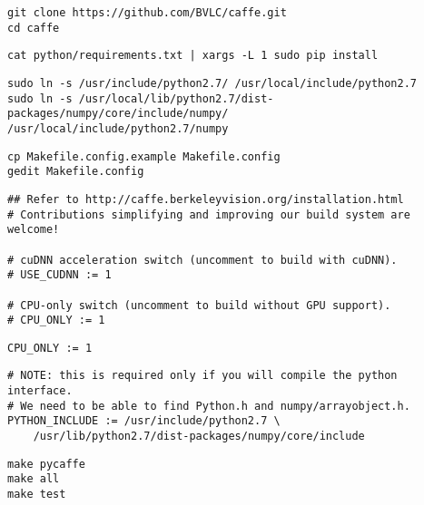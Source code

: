 \documentclass[a4paper,10pt]{jsarticle}
\begin{document}
\begin{lstlisting}[basicstyle=\ttfamily\footnotesize, frame=single]
git clone https://github.com/BVLC/caffe.git
cd caffe
\end{lstlisting}

\begin{lstlisting}[basicstyle=\ttfamily\footnotesize, frame=single]
cat python/requirements.txt | xargs -L 1 sudo pip install
\end{lstlisting}

\begin{lstlisting}[basicstyle=\ttfamily\footnotesize, frame=single]
sudo ln -s /usr/include/python2.7/ /usr/local/include/python2.7
sudo ln -s /usr/local/lib/python2.7/dist-packages/numpy/core/include/numpy/
/usr/local/include/python2.7/numpy
\end{lstlisting}

\begin{lstlisting}[basicstyle=\ttfamily\footnotesize, frame=single]
cp Makefile.config.example Makefile.config
gedit Makefile.config
\end{lstlisting}

\begin{lstlisting}[basicstyle=\ttfamily\footnotesize, frame=single]
## Refer to http://caffe.berkeleyvision.org/installation.html
# Contributions simplifying and improving our build system are welcome!

# cuDNN acceleration switch (uncomment to build with cuDNN).
# USE_CUDNN := 1

# CPU-only switch (uncomment to build without GPU support).
# CPU_ONLY := 1
\end{lstlisting}

\begin{lstlisting}[basicstyle=\ttfamily\footnotesize, frame=single]
CPU_ONLY := 1
\end{lstlisting}

\begin{lstlisting}[basicstyle=\ttfamily\footnotesize, frame=single]
# NOTE: this is required only if you will compile the python interface.
# We need to be able to find Python.h and numpy/arrayobject.h.
PYTHON_INCLUDE := /usr/include/python2.7 \
    /usr/lib/python2.7/dist-packages/numpy/core/include
\end{lstlisting}

\begin{lstlisting}[basicstyle=\ttfamily\footnotesize, frame=single]
make pycaffe
make all
make test
\end{lstlisting}
\end{document}

